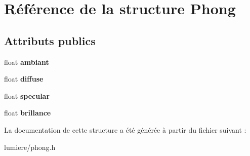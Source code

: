 \hypertarget{struct_phong}{}\section{Référence de la structure Phong}
\label{struct_phong}
\subsection*{Attributs publics}
\begin{DoxyCompactItemize}
\item 
\hypertarget{struct_phong_a1f50a745caebf233aaf31057e910439d}{}float {\bfseries ambiant}\label{struct_phong_a1f50a745caebf233aaf31057e910439d}

\item 
\hypertarget{struct_phong_ace60f7a6a4e76c91fb43b8c8fbb4080f}{}float {\bfseries diffuse}\label{struct_phong_ace60f7a6a4e76c91fb43b8c8fbb4080f}

\item 
\hypertarget{struct_phong_a396a92b4f5fc8b4e4a7f620cba899fb2}{}float {\bfseries specular}\label{struct_phong_a396a92b4f5fc8b4e4a7f620cba899fb2}

\item 
\hypertarget{struct_phong_aa2ebc479d43604c42103f9318f4833eb}{}float {\bfseries brillance}\label{struct_phong_aa2ebc479d43604c42103f9318f4833eb}

\end{DoxyCompactItemize}


La documentation de cette structure a été générée à partir du fichier suivant \+:\begin{DoxyCompactItemize}
\item 
lumiere/phong.\+h\end{DoxyCompactItemize}
